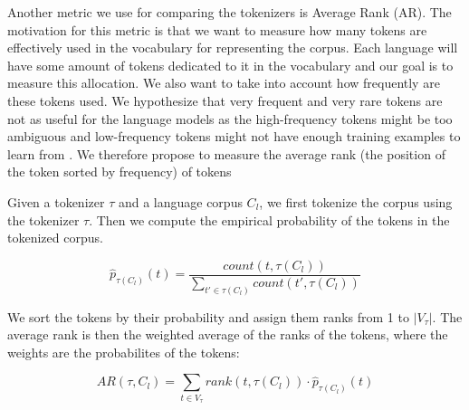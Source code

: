 Another metric we use for comparing the tokenizers is Average Rank (AR). The motivation for this metric is that we want to measure how many tokens are effectively used in the vocabulary for representing the corpus. Each language will have some amount of tokens dedicated to it in the vocabulary and our goal is to measure this allocation. We also want to take into account how frequently are these tokens used. We hypothesize that very frequent and very rare tokens are not as useful for the language models as the high-frequency tokens might be too ambiguous and low-frequency tokens might not have enough training examples to learn from \cite{gowda_finding_2020}. We therefore propose to measure the average rank (the position of the token sorted by frequency) of tokens 

Given a tokenizer $\tau$ and a language corpus $C_l$, we first tokenize the corpus using the tokenizer $\tau$. Then we compute the empirical probability of the tokens in the tokenized corpus.

\begin{equation}
    \hat{p}_{\tau(C_l)}(t) = \frac{count(t, \tau(C_l))}{\sum_{t' \in \tau(C_l)} count(t', \tau(C_l))}
\end{equation}

We sort the tokens by their probability and assign them ranks from 1 to $|V_\tau|$. The average rank is then the weighted average of the ranks of the tokens, where the weights are the probabilites of the tokens:

\begin{equation}
    AR(\tau, C_l) = \sum_{t \in V_\tau} rank(t, \tau(C_l)) \cdot \hat{p}_{\tau(C_l)}(t)
\end{equation}

